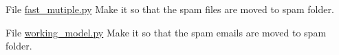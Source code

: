 
\begin{DoxyRefList}
\item[File \mbox{\hyperlink{fast__mutiple_8py}{fast\+\_\+mutiple.py}} ]\label{todo__todo000001}%
%
Make it so that the spam files are moved to spam folder.  
\item[File \mbox{\hyperlink{working__model_8py}{working\+\_\+model.py}} ]\label{todo__todo000002}%
%
Make it so that the spam emails are moved to spam folder. 
\end{DoxyRefList}